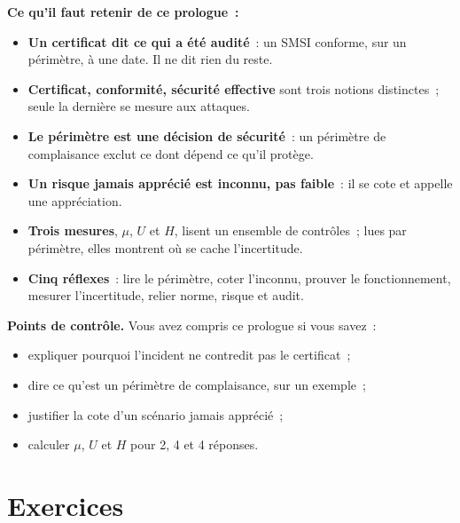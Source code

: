 \separateur

\begin{boxresume}
\textbf{Ce qu'il faut retenir de ce prologue~:}
\begin{itemize}
    \item \textbf{Un certificat dit ce qui a été audité}~: un SMSI conforme,
          sur un périmètre, à une date. Il ne dit rien du reste.
    \item \textbf{Certificat, conformité, sécurité effective} sont trois
          notions distinctes~; seule la dernière se mesure aux attaques.
    \item \textbf{Le périmètre est une décision de sécurité}~: un périmètre
          de complaisance exclut ce dont dépend ce qu'il protège.
    \item \textbf{Un risque jamais apprécié est inconnu, pas faible}~: il se
          cote \NEK{} et appelle une appréciation.
    \item \textbf{Trois mesures}, $\mu$, $U$ et $H$, lisent un ensemble de
          contrôles~; lues par périmètre, elles montrent où se cache
          l'incertitude.
    \item \textbf{Cinq réflexes}~: lire le périmètre, coter l'inconnu, prouver
          le fonctionnement, mesurer l'incertitude, relier norme, risque et
          audit.
\end{itemize}
\end{boxresume}

\begin{boxinfo}
\textbf{Points de contrôle.} Vous avez compris ce prologue si vous savez~:
\begin{itemize}
    \item expliquer pourquoi l'incident ne contredit pas le certificat~;
    \item dire ce qu'est un périmètre de complaisance, sur un exemple~;
    \item justifier la cote \NEK{} d'un scénario jamais apprécié~;
    \item calculer $\mu$, $U$ et $H$ pour 2, 4 et 4 réponses.
\end{itemize}
\end{boxinfo}

\section*{Exercices}

